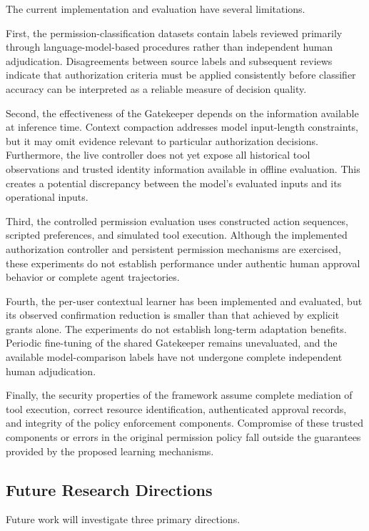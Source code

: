 \documentclass[10pt,conference]{IEEEtran}
\begin{document}
The current implementation and evaluation have several limitations.

First, the permission-classification datasets contain labels reviewed primarily through language-model-based procedures rather than independent human adjudication. Disagreements between source labels and subsequent reviews indicate that authorization criteria must be applied consistently before classifier accuracy can be interpreted as a reliable measure of decision quality.

Second, the effectiveness of the Gatekeeper depends on the information available at inference time. Context compaction addresses model input-length constraints, but it may omit evidence relevant to particular authorization decisions. Furthermore, the live controller does not yet expose all historical tool observations and trusted identity information available in offline evaluation. This creates a potential discrepancy between the model's evaluated inputs and its operational inputs.

Third, the controlled permission evaluation
uses constructed action sequences, scripted
preferences, and simulated tool execution.
Although the implemented authorization
controller and persistent permission mechanisms
are exercised, these experiments do not
establish performance under authentic human
approval behavior or complete agent trajectories.

Fourth, the per-user contextual learner has
been implemented and evaluated, but its
observed confirmation reduction is smaller
than that achieved by explicit grants alone.
The experiments do not establish long-term
adaptation benefits. Periodic fine-tuning
of the shared Gatekeeper remains unevaluated,
and the available model-comparison labels
have not undergone complete independent
human adjudication.

Finally, the security properties of the framework assume complete mediation of tool execution, correct resource identification, authenticated approval records, and integrity of the policy enforcement components. Compromise of these trusted components or errors in the original permission policy fall outside the guarantees provided by the proposed learning mechanisms.

\subsection{Future Research Directions}

Future work will investigate three primary directions.
\end{document}

